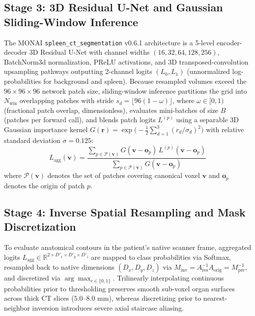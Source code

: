 \documentclass[10pt,twocolumn]{article}
\begin{document}
\subsection{Stage 3: 3D Residual U-Net and Gaussian Sliding-Window Inference}
The MONAI \texttt{spleen\_ct\_segmentation} v0.6.1 architecture \cite{kerfoot2019,monaibundle2024} is a 5-level encoder-decoder 3D Residual U-Net with channel widths $(16, 32, 64, 128, 256)$, BatchNorm3d normalization, PReLU activations, and 3D transposed-convolution upsampling pathways outputting 2-channel logits $(L_0, L_1)$ (unnormalized log-probabilities for background and spleen). Because resampled volumes exceed the $96 \times 96 \times 96$ network patch size, sliding-window inference partitions the grid into $N_{\text{win}}$ overlapping patches with stride $s_d = \lfloor 96(1 - \omega) \rfloor$, where $\omega \in [0, 1)$ (fractional patch overlap, dimensionless), evaluates mini-batches of size $B$ (patches per forward call), and blends patch logits $L^{(p)}$ using a separable 3D Gaussian importance kernel $G(\mathbf{r}) = \exp\big(-\frac{1}{2}\sum_{d=1}^3 (r_d / \sigma_d)^2\big)$ with relative standard deviation $\sigma = 0.125$:
\begin{equation}
    L_{\text{agg}}(\mathbf{v}) = \frac{\sum_{p \in \mathcal{P}(\mathbf{v})} G(\mathbf{v} - \mathbf{o}_p) \, L^{(p)}(\mathbf{v} - \mathbf{o}_p)}{\sum_{p \in \mathcal{P}(\mathbf{v})} G(\mathbf{v} - \mathbf{o}_p)}
    \label{eq:sw_agg}
\end{equation}
where $\mathcal{P}(\mathbf{v})$ denotes the set of patches covering canonical voxel $\mathbf{v}$ and $\mathbf{o}_p$ denotes the origin of patch $p$.

\subsection{Stage 4: Inverse Spatial Resampling and Mask Discretization}
To evaluate anatomical contours in the patient's native scanner frame, aggregated logits $L_{\text{agg}} \in \mathbb{R}^{2 \times D'_x \times D'_y \times D'_z}$ are mapped to class probabilities via Softmax, resampled back to native dimensions $(D_x, D_y, D_z)$ via $M_{\text{inv}} = A_{\text{res}}^{-1} A_{\text{orig}} = M_{\text{pre}}^{-1}$, and discretized via $\arg\max_{c \in \{0,1\}}$. Trilinearly interpolating continuous probabilities prior to thresholding preserves smooth sub-voxel organ surfaces across thick CT slices ($5.0\text{--}8.0\text{ mm}$), whereas discretizing prior to nearest-neighbor inversion introduces severe axial staircase aliasing.
\end{document}
